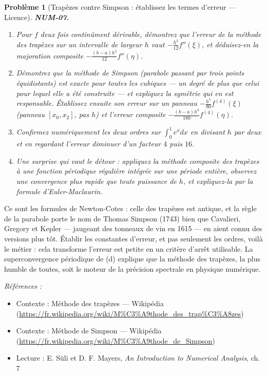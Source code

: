 \documentclass[11pt]{article}
\newtheorem{problem}{Problème}
\newenvironment{refs}{\par\small\noindent\emph{Références :}\begin{itemize}\setlength\itemsep{0pt}}{\end{itemize}\normalsize}
\begin{document}
\bigskip

\begin{problem}[{Trapèzes contre Simpson : établissez les termes d'erreur --- Licence}]
\textbf{NUM-07.} \begin{enumerate}
\item[(a)] Pour $f$ deux fois continûment
dérivable, démontrez que l'erreur de la méthode des trapèzes sur un intervalle de
largeur $h$ vaut $-\tfrac{h^3}{12} f''(\xi)$, et déduisez-en la majoration
composite $-\tfrac{(b-a)h^2}{12} f''(\eta)$.
\item[(b)] Démontrez que la méthode de Simpson (parabole
passant par trois points équidistants) est exacte pour toutes les cubiques --- un degré
de plus que celui pour lequel elle a été construite --- et expliquez la symétrie qui en
est responsable. Établissez ensuite son erreur sur un panneau
$-\tfrac{h^5}{90} f^{(4)}(\xi)$ (panneau $[x_0, x_2]$, pas
$h$) et l'erreur composite $-\tfrac{(b-a)h^4}{180} f^{(4)}(\eta)$.
\item[(c)] Confirmez numériquement les deux
ordres sur $\int_0^1 e^x dx$ en divisant $h$ par deux et en regardant l'erreur
diminuer d'un facteur $4$ puis $16$.
\item[(d)] Une surprise qui vaut le détour : appliquez la méthode
composite des trapèzes à une fonction périodique régulière intégrée sur une période
entière, observez une convergence plus rapide que toute puissance de $h$, et
expliquez-la par la formule d'Euler-Maclaurin.
\end{enumerate}

\end{problem}

\noindent Ce sont les formules de Newton-Cotes : celle des trapèzes est
antique, et la règle de la parabole porte le nom de Thomas Simpson (1743) bien que
Cavalieri, Gregory et Kepler --- jaugeant des tonneaux de vin en 1615 --- en aient connu
des versions plus tôt. Établir les constantes d'erreur, et pas seulement les ordres,
voilà le métier : cela transforme \og{} l'erreur est petite \fg{} en un critère d'arrêt
utilisable. La superconvergence périodique de (d) explique que la méthode des
trapèzes, la plus humble de toutes, soit le moteur de la précision spectrale en
physique numérique.

\begin{refs}
\item Contexte : Méthode des trapèzes --- Wikipédia (\url{https://fr.wikipedia.org/wiki/M%C3%A9thode_des_trap%C3%A8zes})
\item Contexte : Méthode de Simpson --- Wikipédia (\url{https://fr.wikipedia.org/wiki/M%C3%A9thode_de_Simpson})
\item Lecture : E. Süli et D. F. Mayers, \textit{An Introduction to Numerical Analysis}, ch. 7
\end{refs}
\end{document}
